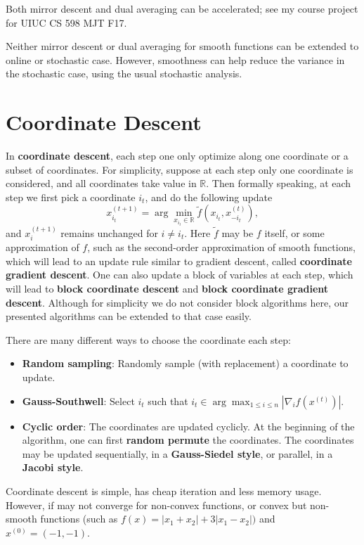 \documentclass[openany]{book}
\theoremstyle{definition}
\theoremstyle{remark}
\begin{document}
Both mirror descent and dual averaging can be accelerated; see my course project for UIUC CS 598 MJT F17.

Neither mirror descent or dual averaging for smooth functions can be extended to online or stochastic case. However, smoothness can help reduce the variance in the stochastic case, using the usual stochastic analysis.

\chapter{Coordinate Descent}
In \textbf{coordinate descent}, each step one only optimize along one coordinate or a subset of coordinates. For simplicity, suppose at each step only one coordinate is considered, and all coordinates take value in $\mathbb{R}$. Then formally speaking, at each step we first pick a coordinate $i_t$, and do the following update
\begin{equation}
    x^{(t+1)}_{i_t}=\arg\min_{x_{i_t}\in \mathbb{R}}\tilde{f}(x_{i_t},x^{(t)}_{-i_t}),
\end{equation}
and $x^{(t+1)}_i$ remains unchanged for $i\ne i_t$. Here $\tilde{f}$ may be $f$ itself, or some approximation of $f$, such as the second-order approximation of smooth functions, which will lead to an update rule similar to gradient descent, called \textbf{coordinate gradient descent}. One can also update a block of variables at each step, which will lead to \textbf{block coordinate descent} and \textbf{block coordinate gradient descent}. Although for simplicity we do not consider block algorithms here, our presented algorithms can be extended to that case easily.

There are many different ways to choose the coordinate each step:
\begin{itemize}
    \item \textbf{Random sampling}: Randomly sample (with replacement) a coordinate to update.
    \item \textbf{Gauss-Southwell}: Select $i_t$ such that $i_t\in\arg\max_{1\le i\le n}|\nabla_i f(x^{(t)})|$.
    \item \textbf{Cyclic order}: The coordinates are updated cyclicly. At the beginning of the algorithm, one can first \textbf{random permute} the coordinates. The coordinates may be updated sequentially, in a \textbf{Gauss-Siedel style}, or parallel, in a \textbf{Jacobi style}.
\end{itemize}

Coordinate descent is simple, has cheap iteration and less memory usage. However, if may not converge for non-convex functions, or convex but non-smooth functions (such as $f(x)=|x_1+x_2|+3|x_1-x_2|)$ and $x^{(0)}=(-1,-1)$.
\end{document}
